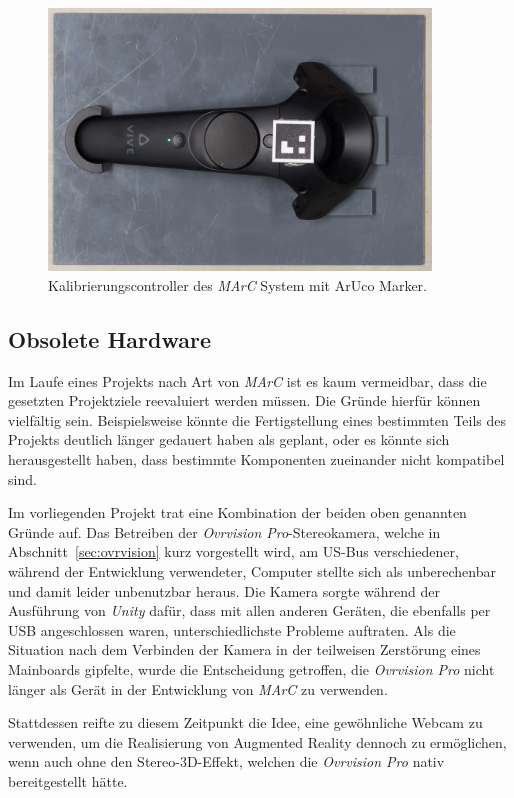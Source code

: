 	\begin{figure}[H]
		\centering
		\includegraphics[width=4in]{Bilder/Eigene Fotos/IMG_0032.jpg}
		\caption{Kalibrierungscontroller des \textit{MArC} System mit ArUco Marker.}
		\label{fig:KontrollerMarc}
	\end{figure}
	
\subsection{Obsolete Hardware}\label{sec:obsoleteHardware}
Im Laufe eines Projekts nach Art von \emph{MArC} ist es kaum vermeidbar, dass die gesetzten Projektziele reevaluiert werden müssen. Die Gründe hierfür können vielfältig sein. Beispielsweise könnte die Fertigstellung eines bestimmten Teils des Projekts deutlich länger gedauert haben als geplant, oder es könnte sich herausgestellt haben, dass bestimmte Komponenten zueinander nicht kompatibel sind.

Im vorliegenden Projekt trat eine Kombination der beiden oben genannten Gründe auf. Das Betreiben der \emph{Ovrvision Pro}-Stereokamera, welche in Abschnitt~\ref{sec:ovrvision} kurz vorgestellt wird, am US-Bus verschiedener, während der Entwicklung verwendeter, Computer stellte sich als unberechenbar und damit leider unbenutzbar heraus. Die Kamera sorgte während der Ausführung von \textit{Unity} dafür, dass mit allen anderen Geräten, die ebenfalls per USB angeschlossen waren, unterschiedlichste Probleme auftraten. Als die Situation nach dem Verbinden der Kamera in der teilweisen Zerstörung eines Mainboards gipfelte, wurde die Entscheidung getroffen, die \emph{Ovrvision Pro} nicht länger als Gerät in der Entwicklung von \emph{MArC} zu verwenden.

Stattdessen reifte zu diesem Zeitpunkt die Idee, eine gewöhnliche Webcam zu verwenden, um die Realisierung von Augmented Reality dennoch zu ermöglichen, wenn auch ohne den Stereo-3D-Effekt, welchen die \emph{Ovrvision Pro} nativ bereitgestellt hätte.

